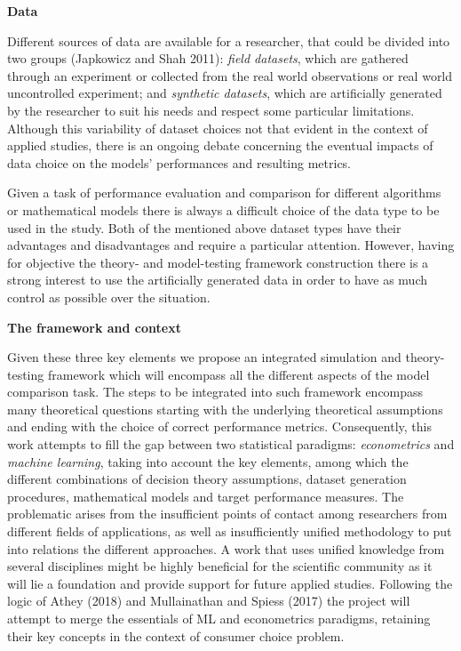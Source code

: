 \documentclass[12pt,]{article}
\begin{document}
\textbf{Data}

Different sources of data are available for a researcher, that could be
divided into two groups (Japkowicz and Shah 2011): \emph{field
datasets}, which are gathered through an experiment or collected from
the real world observations or real world uncontrolled experiment; and
\emph{synthetic datasets}, which are artificially generated by the
researcher to suit his needs and respect some particular limitations.
Although this variability of dataset choices not that evident in the
context of applied studies, there is an ongoing debate concerning the
eventual impacts of data choice on the models' performances and
resulting metrics.

Given a task of performance evaluation and comparison for different
algorithms or mathematical models there is always a difficult choice of
the data type to be used in the study. Both of the mentioned above
dataset types have their advantages and disadvantages and require a
particular attention. However, having for objective the theory- and
model-testing framework construction there is a strong interest to use
the artificially generated data in order to have as much control as
possible over the situation.

\textbf{The framework and context}

Given these three key elements we propose an integrated simulation and
theory-testing framework which will encompass all the different aspects
of the model comparison task. The steps to be integrated into such
framework encompass many theoretical questions starting with the
underlying theoretical assumptions and ending with the choice of correct
performance metrics. Consequently, this work attempts to fill the gap
between two statistical paradigms: \emph{econometrics} and \emph{machine
learning}, taking into account the key elements, among which the
different combinations of decision theory assumptions, dataset
generation procedures, mathematical models and target performance
measures. The problematic arises from the insufficient points of contact
among researchers from different fields of applications, as well as
insufficiently unified methodology to put into relations the different
approaches. A work that uses unified knowledge from several disciplines
might be highly beneficial for the scientific community as it will lie a
foundation and provide support for future applied studies. Following the
logic of Athey (2018) and Mullainathan and Spiess (2017) the project
will attempt to merge the essentials of ML and econometrics paradigms,
retaining their key concepts in the context of consumer choice problem.
\end{document}
